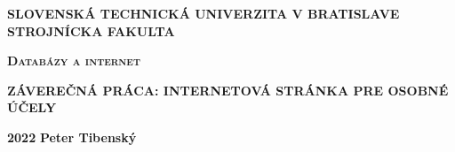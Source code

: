 \renewcommand\thepage{\roman{page}}
\thispagestyle{empty}

\noindent \begin{center}
\textbf{{\large{}SLOVENSKÁ TECHNICKÁ UNIVERZITA V BRATISLAVE}}\\
\textbf{{\large{}STROJNÍCKA FAKULTA}}\textbf{\large{} }\\
\vspace{3cm}
\par\end{center}

\noindent \begin{center}
\vspace{3cm}
\par\end{center}



\begin{center}
\textbf{\textsc{\Large{}Databázy a internet}}\\
\par\end{center}{\Large \par}

\begin{center}
\textbf{\large{}ZÁVEREČNÁ PRÁCA: INTERNETOVÁ STRÁNKA PRE OSOBNÉ ÚČELY }\\
\par\end{center}{\large \par}





\vfill
\noindent \textbf{\large{}2022} \hfill \textbf{\large{} Peter Tibenský}
\cleardoublepage

